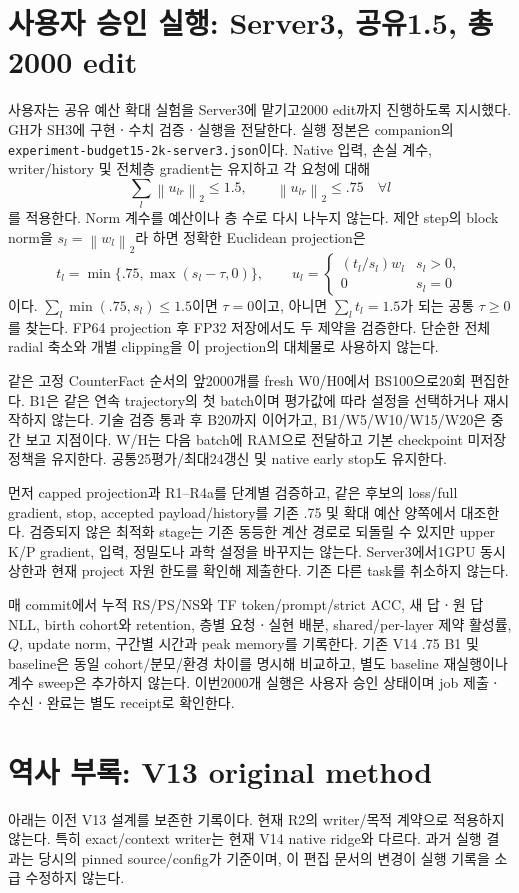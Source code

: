 \documentclass[11pt]{article}
\newcommand{\norm}[1]{\left\lVert #1\right\rVert}
\begin{document}
\section{사용자 승인 실행: Server3, 공유1.5, 총2000 edit}
사용자는 공유 예산 확대 실험을 Server3에 맡기고2000 edit까지 진행하도록 지시했다.
GH가 SH3에 구현ㆍ수치 검증ㆍ실행을 전달한다. 실행 정본은 companion의
\texttt{experiment-budget15-2k-server3.json}이다.
Native 입력, 손실 계수, writer/history 및 전체층 gradient는 유지하고
각 요청에 대해
\[
 \sum_l\norm{u_{lr}}_2\le1.5,\qquad \norm{u_{lr}}_2\le.75\quad\forall l
\]
를 적용한다. Norm 계수를 예산이나 층 수로 다시 나누지 않는다.
제안 step의 block norm을 $s_l=\norm{w_l}_2$라 하면 정확한 Euclidean projection은
\[
 t_l=\min\{.75,\max(s_l-\tau,0)\},\qquad
 u_l=\begin{cases}(t_l/s_l)w_l&s_l>0,\\0&s_l=0\end{cases}
\]
이다. $\sum_l\min(.75,s_l)\le1.5$이면 $\tau=0$이고, 아니면
$\sum_l t_l=1.5$가 되는 공통 $\tau\ge0$를 찾는다.
FP64 projection 후 FP32 저장에서도 두 제약을 검증한다.
단순한 전체 radial 축소와 개별 clipping을 이 projection의 대체물로 사용하지 않는다.

같은 고정 CounterFact 순서의 앞2000개를 fresh W0/H0에서 BS100으로20회 편집한다.
B1은 같은 연속 trajectory의 첫 batch이며 평가값에 따라 설정을 선택하거나 재시작하지 않는다.
기술 검증 통과 후 B20까지 이어가고, B1/W5/W10/W15/W20은 중간 보고 지점이다.
W/H는 다음 batch에 RAM으로 전달하고 기본 checkpoint 미저장 정책을 유지한다.
공통25평가/최대24갱신 및 native early stop도 유지한다.

먼저 capped projection과 R1--R4a를 단계별 검증하고, 같은 후보의 loss/full gradient,
stop, accepted payload/history를 기존 .75 및 확대 예산 양쪽에서 대조한다.
검증되지 않은 최적화 stage는 기존 동등한 계산 경로로 되돌릴 수 있지만 upper K/P
gradient, 입력, 정밀도나 과학 설정을 바꾸지는 않는다.
Server3에서1GPU 동시 상한과 현재 project 자원 한도를 확인해 제출한다.
기존 다른 task를 취소하지 않는다.

매 commit에서 누적 RS/PS/NS와 TF token/prompt/strict ACC, 새 답ㆍ원 답 NLL,
birth cohort와 retention, 층별 요청ㆍ실현 배분, shared/per-layer 제약 활성률,
$Q$, update norm, 구간별 시간과 peak memory를 기록한다.
기존 V14 .75 B1 및 baseline은 동일 cohort/분모/환경 차이를 명시해 비교하고,
별도 baseline 재실행이나 계수 sweep은 추가하지 않는다.
이번2000개 실행은 사용자 승인 상태이며 job 제출ㆍ수신ㆍ완료는 별도 receipt로 확인한다.

\clearpage
\appendix
\section*{역사 부록: V13 original method}
아래는 이전 V13 설계를 보존한 기록이다. 현재 R2의 writer/목적 계약으로 적용하지 않는다.
특히 exact/context writer는 현재 V14 native ridge와 다르다. 과거 실행 결과는 당시의
pinned source/config가 기준이며, 이 편집 문서의 변경이 실행 기록을 소급 수정하지 않는다.
\end{document}
